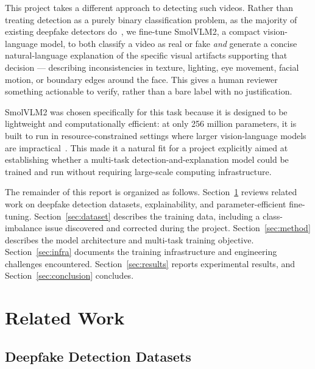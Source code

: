 \documentclass[acmsmall,review=false]{acmart}
\begin{document}
This project takes a different approach to detecting such videos. Rather than
treating detection as a purely binary classification problem, as the majority
of existing deepfake detectors do~\citep{li2020celebdf}, we fine-tune SmolVLM2,
a compact vision-language model, to both classify a video as real or fake
\emph{and} generate a concise natural-language explanation of the specific
visual artifacts supporting that decision --- describing inconsistencies in
texture, lighting, eye movement, facial motion, or boundary edges around the
face. This gives a human reviewer something actionable to verify, rather than
a bare label with no justification.

SmolVLM2 was chosen specifically for this task because it is designed to be
lightweight and computationally efficient: at only 256 million parameters, it
is built to run in resource-constrained settings where larger vision-language
models are impractical~\citep{marafioti2025smolvlm}. This made it a natural fit
for a project explicitly aimed at establishing whether a multi-task
detection-and-explanation model could be trained and run without requiring
large-scale computing infrastructure.

The remainder of this report is organized as follows. Section~\ref{sec:related}
reviews related work on deepfake detection datasets, explainability, and
parameter-efficient fine-tuning. Section~\ref{sec:dataset} describes the
training data, including a class-imbalance issue discovered and corrected
during the project. Section~\ref{sec:method} describes the model architecture
and multi-task training objective. Section~\ref{sec:infra} documents the
training infrastructure and engineering challenges encountered.
Section~\ref{sec:results} reports experimental results, and
Section~\ref{sec:conclusion} concludes.

\section{Related Work}
\label{sec:related}

\subsection{Deepfake Detection Datasets}
\end{document}
